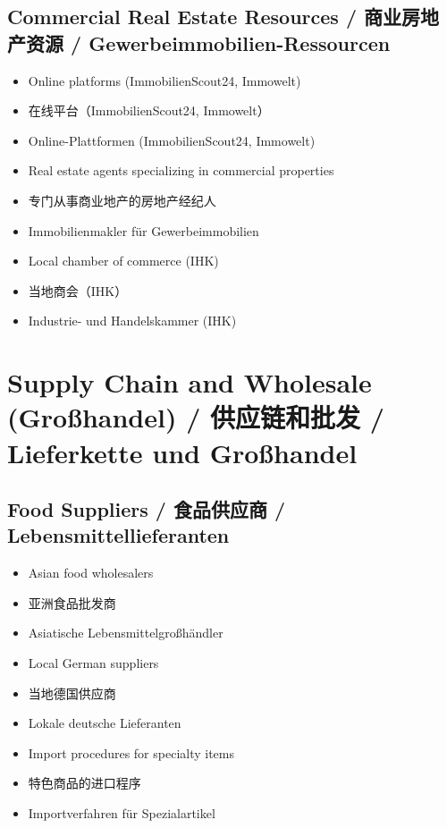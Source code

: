 \subsection{Commercial Real Estate Resources / 商业房地产资源 / Gewerbeimmobilien-Ressourcen}
\begin{itemize}
    \item Online platforms (ImmobilienScout24, Immowelt)
    \item 在线平台（ImmobilienScout24, Immowelt）
    \item Online-Plattformen (ImmobilienScout24, Immowelt)
    \item Real estate agents specializing in commercial properties
    \item 专门从事商业地产的房地产经纪人
    \item Immobilienmakler für Gewerbeimmobilien
    \item Local chamber of commerce (IHK)
    \item 当地商会（IHK）
    \item Industrie- und Handelskammer (IHK)
\end{itemize}

\section{Supply Chain and Wholesale (Großhandel) / 供应链和批发 / Lieferkette und Großhandel}

\subsection{Food Suppliers / 食品供应商 / Lebensmittellieferanten}
\begin{itemize}
    \item Asian food wholesalers
    \item 亚洲食品批发商
    \item Asiatische Lebensmittelgroßhändler
    \item Local German suppliers
    \item 当地德国供应商
    \item Lokale deutsche Lieferanten
    \item Import procedures for specialty items
    \item 特色商品的进口程序
    \item Importverfahren für Spezialartikel
\end{itemize}

